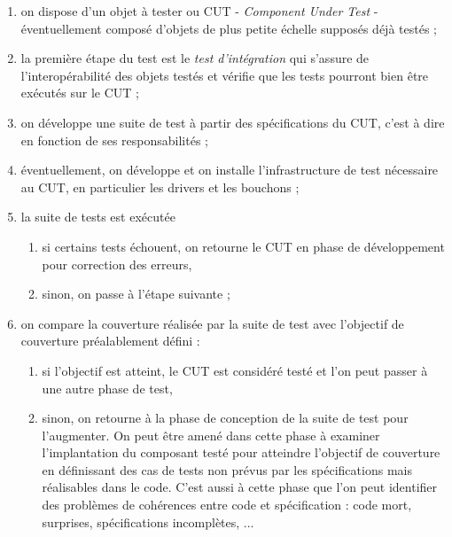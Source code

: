 \begin{enumerate}
       
\item on dispose d'un objet \`a tester ou CUT - 
\emph{Component Under
      Test}
   -  \'eventuellement compos\'e
      d'objets de plus petite \'echelle suppos\'es d\'ej\`a test\'es ; 
\item la premi\`ere \'etape du test est  le 
\emph{test
      d'int\'egration}
   qui s'assure de l'interop\'erabilit\'e des
      objets test\'es et v\'erifie que les tests pourront bien \^etre
      ex\'ecut\'es sur le CUT ; 
\item on d\'eveloppe une suite de test \`a partir des sp\'ecifications
      du CUT, c'est \`a dire en fonction de ses responsabilit\'es ; 
\item \'eventuellement, on d\'eveloppe et on installe
      l'infrastructure de test n\'ecessaire au CUT, en particulier les
      drivers et les bouchons ; 
\item la suite de tests est ex\'ecut\'ee
      
\begin{enumerate}
       
\item si certains tests \'echouent, on retourne le CUT en phase de
      d\'eveloppement pour correction des erreurs, 
\item sinon, on passe \`a l'\'etape suivante ;
\end{enumerate}
   
\item on compare la couverture r\'ealis\'ee par la suite de test avec
      l'objectif de couverture pr\'ealablement d\'efini :
      
\begin{enumerate}
       
\item si l'objectif est atteint, le CUT est consid\'er\'e test\'e et
      l'on peut passer \`a une autre phase de test, 
\item sinon, on retourne \`a la phase de conception de la suite
      de test pour l'augmenter. On peut \^etre amen\'e dans cette phase \`a
      examiner l'implantation du composant test\'e pour atteindre
      l'objectif de couverture  en d\'efinissant des cas de tests non
      pr\'evus par les sp\'ecifications mais r\'ealisables dans le
      code. C'est aussi \`a cette phase que l'on peut identifier des
      probl\`emes de coh\'erences entre code et sp\'ecification : code mort,
      surprises, sp\'ecifications incompl\`etes,
      ...
\end{enumerate}
  
\end{enumerate}
  
